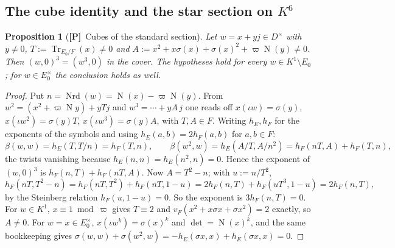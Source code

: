 \documentclass[11pt]{article}
\newcommand{\Nm}{\operatorname N}
\newcommand{\Nrd}{\operatorname{Nrd}}
\newcommand{\Tr}{\operatorname{Tr}}
\newcommand{\Ptag}{\textnormal{\textbf{[P]}}}
\theoremstyle{plain}
\newtheorem{proposition}[theorem]{Proposition}
\theoremstyle{definition}
\begin{document}
\subsection{The cube identity and the star section on $K^6$}
\begin{proposition}[\Ptag\ Cubes of the standard section]\label{prop:cubeidentity}
Let $w=x+yj\in D^\times$ with $y\ne0$, $T:=\Tr_{E_0/F}(x)\ne0$ and
$A:=x^2+x\sigma(x)+\sigma(x)^2+\varpi\Nm(y)\ne0$.  Then
$(w,0)^3=(w^3,0)$ in the cover.  The hypotheses hold for every
$w\in K^1\setminus E_0$; for $w\in E_0^\times$ the conclusion holds as well.
\end{proposition}
\begin{proof}
Put $n=\Nrd(w)=\Nm(x)-\varpi\Nm(y)$.  From $w^2=(x^2+\varpi\Nm y)+yTj$ and
$w^3=\cdots+yA\,j$ one reads off $x(\iota w)=\sigma(y)$,
$x(\iota w^2)=\sigma(y)T$, $x(\iota w^3)=\sigma(y)A$, with $T,A\in F$.
Writing $h_E,h_F$ for the exponents of the symbols and using
$h_E(a,b)=2h_F(a,b)$ for $a,b\in F$:
\[
 \beta(w,w)=h_E(T,T/n)=h_F(T,n),\qquad
 \beta(w^2,w)=h_E(A/T,A/n^2)=h_F(nT,A)+h_F(T,n),
\]
the twists vanishing because $h_E(n,n)=h_E(n^2,n)=0$.  Hence the exponent
of $(w,0)^3$ is $h_F(n,T)+h_F(nT,A)$.  Now $A=T^2-n$; with $u:=n/T^2$,
\[
 h_F(nT,T^2-n)=h_F(nT,T^2)+h_F(nT,1-u)=2h_F(n,T)+h_F(uT^3,1-u)=2h_F(n,T),
\]
by the Steinberg relation $h_F(u,1-u)=0$.  So the exponent is
$3h_F(n,T)=0$.  For $w\in K^1$, $x\equiv1\bmod\varpi$ gives $T\equiv2$ and
$v_F(x^2+x\sigma x+\sigma x^2)=2$ exactly, so $A\ne0$.  For $w=x\in E_0^\times$,
$x(\iota w^k)=\sigma(x)^k$ and $\det=\Nm(x)^k$, and the same bookkeeping
gives $\sigma(w,w)+\sigma(w^2,w)=-h_E(\sigma x,x)+h_E(\sigma x,x)=0$.
\end{proof}
\end{document}
